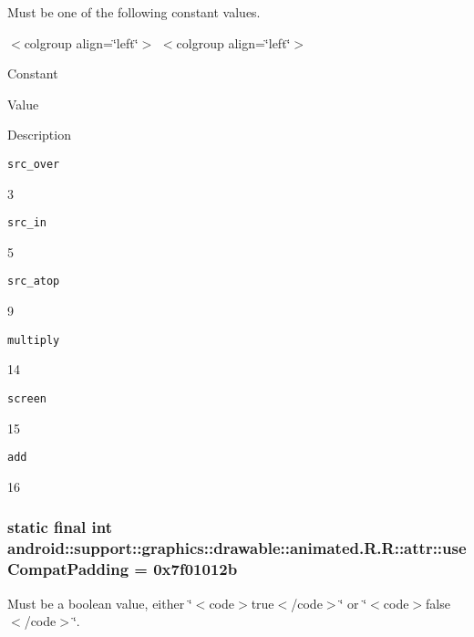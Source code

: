 Must be one of the following constant values. \begin{TabularC}{0}
\hline
\end{TabularC}
$<$colgroup align=\char`\"{}left\char`\"{}$>$ $<$colgroup align=\char`\"{}left\char`\"{}$>$ 

Constant

Value

Description 

{\tt src\_\-over}

3

{\tt src\_\-in}

5

{\tt src\_\-atop}

9

{\tt multiply}

14

{\tt screen}

15

{\tt add}

16\hypertarget{classandroid_1_1support_1_1graphics_1_1drawable_1_1animated_1_1_r_1_1attr_79a62d68fa858301722872069b8872ee}{
\subsubsection[{useCompatPadding}]{\setlength{\rightskip}{0pt plus 5cm}static final int android::support::graphics::drawable::animated.R.R::attr::useCompatPadding = 0x7f01012b}}
\label{classandroid_1_1support_1_1graphics_1_1drawable_1_1animated_1_1_r_1_1attr_79a62d68fa858301722872069b8872ee}


Must be a boolean value, either \char`\"{}$<$code$>$true$<$/code$>$\char`\"{} or \char`\"{}$<$code$>$false$<$/code$>$\char`\"{}. 

